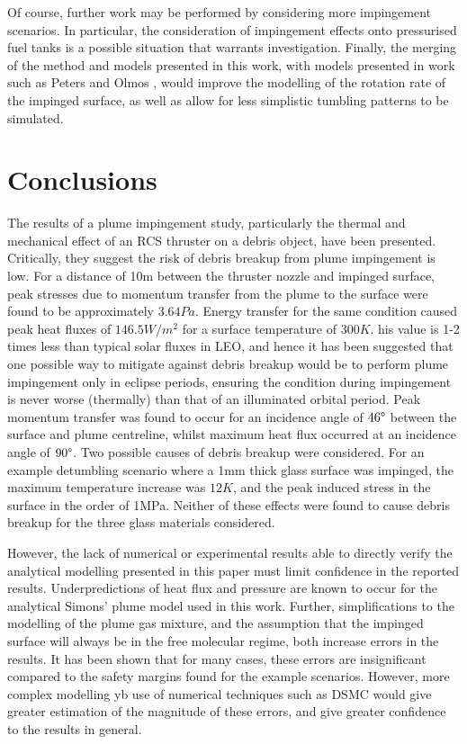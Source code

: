 \documentclass[journal]{new-aiaa}
\begin{document}
Of course, further work may be performed by considering more impingement scenarios. In particular, the consideration of impingement effects onto pressurised fuel tanks is a possible situation that warrants investigation. Finally, the merging of the method and models presented in this work, with models presented in work such as Peters and Olmos \cite{petersCOBRAContactlessDetumbling2016}, would improve the modelling of the rotation rate of the impinged surface, as well as allow for less simplistic tumbling patterns to be simulated. 



\section{Conclusions}

The results of a plume impingement study, particularly the thermal and mechanical effect of an RCS thruster on a debris object, have been presented. Critically, they suggest the risk of debris breakup from plume impingement is low. For a distance of 10m between the thruster nozzle and impinged surface, peak stresses due to momentum transfer from the plume to the surface were found to be approximately $3.64Pa$. Energy transfer for the same condition caused peak heat fluxes of $146.5W/m^2$ for a surface temperature of $300K$. his value is 1-2 times less than typical solar fluxes in LEO, and hence it has been suggested that one possible way to mitigate against debris breakup would be to perform plume impingement only in eclipse periods, ensuring the condition during impingement is never worse (thermally) than that of an illuminated orbital period. Peak momentum transfer was found to occur for an incidence angle of $46\degree$ between the surface and plume centreline, whilst maximum heat flux occurred at an incidence angle of $90 \degree$. Two possible causes of debris breakup were considered. For an example detumbling scenario where a 1mm thick glass surface was impinged, the maximum temperature increase was $12K$, and the peak induced stress in the surface in the order of 1MPa. Neither of these effects were found to cause debris breakup for the three glass materials considered.

However, the lack of numerical or experimental results able to directly verify the analytical modelling presented in this paper must limit confidence in the reported results. Underpredictions of heat flux and pressure are known to occur for the analytical Simons' plume model used in this work. Further, simplifications to the modelling of the plume gas mixture, and the assumption that the impinged surface will always be in the free molecular regime, both increase errors in the results. It has been shown that for many cases, these errors are insignificant compared to the safety margins found for the example scenarios. However, more complex modelling yb use of numerical techniques such as DSMC would give greater estimation of the magnitude of these errors, and give greater confidence to the results in general.
\end{document}

